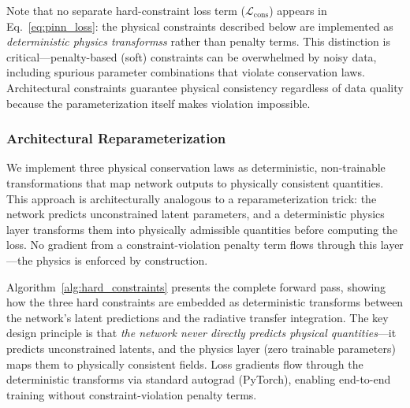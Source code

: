\documentclass[usenatbib]{mnras}
\begin{document}
Note that no separate hard-constraint loss term ($\mathcal{L}_{\text{cons}}$) appears in Eq.~\ref{eq:pinn_loss}: the physical constraints described below are implemented as \textit{deterministic physics transformss} rather than penalty terms. This distinction is critical---penalty-based (soft) constraints can be overwhelmed by noisy data, including spurious parameter combinations that violate conservation laws. Architectural constraints guarantee physical consistency regardless of data quality because the parameterization itself makes violation impossible.

\subsubsection{Architectural Reparameterization}

We implement three physical conservation laws as deterministic, non-trainable transformations that map network outputs to physically consistent quantities. This approach is architecturally analogous to a reparameterization trick: the network predicts unconstrained latent parameters, and a deterministic physics layer transforms them into physically admissible quantities before computing the loss. No gradient from a constraint-violation penalty term flows through this layer---the physics is enforced by construction.

Algorithm~\ref{alg:hard_constraints} presents the complete forward pass, showing how the three hard constraints are embedded as deterministic transforms between the network's latent predictions and the radiative transfer integration. The key design principle is that \textit{the network never directly predicts physical quantities}---it predicts unconstrained latents, and the physics layer (zero trainable parameters) maps them to physically consistent fields. Loss gradients flow through the deterministic transforms via standard autograd (PyTorch), enabling end-to-end training without constraint-violation penalty terms.
\end{document}
